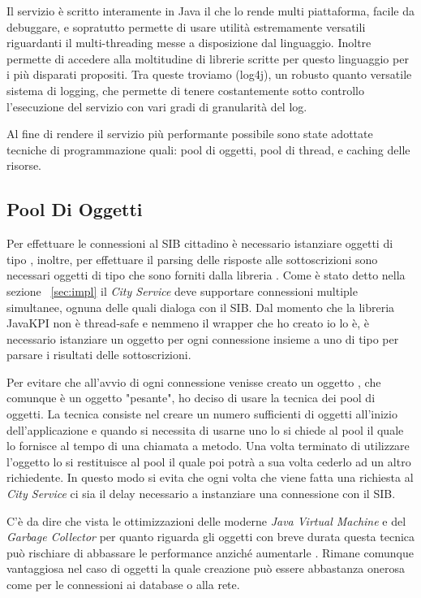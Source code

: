 Il servizio è scritto interamente in Java il che lo rende multi piattaforma, facile da debuggare, e sopratutto permette di usare utilità estremamente versatili riguardanti il multi-threading messe a disposizione dal linguaggio. Inoltre permette di accedere alla moltitudine di librerie scritte per questo linguaggio per i più disparati propositi. Tra queste troviamo (log4j), un robusto quanto versatile sistema di logging, che permette di tenere costantemente sotto controllo l'esecuzione del servizio con vari gradi di granularità del log.

Al fine di rendere il servizio più performante possibile sono state adottate tecniche di programmazione quali: pool di oggetti, pool di thread, e caching delle risorse.


\subsection{Pool Di Oggetti}

Per effettuare le connessioni al SIB cittadino è necessario istanziare oggetti di tipo , inoltre, per effettuare il parsing delle risposte alle sottoscrizioni sono necessari oggetti di tipo  che sono forniti dalla libreria . Come è stato detto nella sezione ~\ref{sec:impl} il \emph{City Service} deve supportare connessioni multiple simultanee, ognuna delle quali dialoga con il SIB. Dal momento che la libreria {JavaKPI} non è thread-safe e nemmeno il wrapper che ho creato io lo è, è necessario istanziare un oggetto  per ogni connessione insieme a uno di tipo  per parsare i risultati delle sottoscrizioni.

Per evitare che all'avvio di ogni connessione venisse creato un oggetto , che comunque è un oggetto "pesante", ho deciso di usare la tecnica dei pool di oggetti. La tecnica consiste nel creare un numero sufficienti di oggetti all'inizio dell'applicazione e quando si necessita di usarne uno lo si chiede al pool il quale lo fornisce al tempo di una chiamata a metodo. Una volta terminato di utilizzare l'oggetto lo si restituisce al pool il quale poi potrà a sua volta cederlo ad un altro richiedente.
In questo modo si evita che ogni volta che viene fatta una richiesta al \emph{City Service} ci sia il delay necessario a instanziare una connessione con il SIB.

C'è da dire che vista le ottimizzazioni delle moderne \emph{Java Virtual Machine} e del \emph{Garbage Collector} per quanto riguarda gli oggetti con breve durata questa tecnica può rischiare di abbassare le performance anziché aumentarle \cite{torok2011}. Rimane comunque vantaggiosa nel caso di oggetti la quale creazione può essere abbastanza onerosa come per le connessioni ai database o alla rete.


